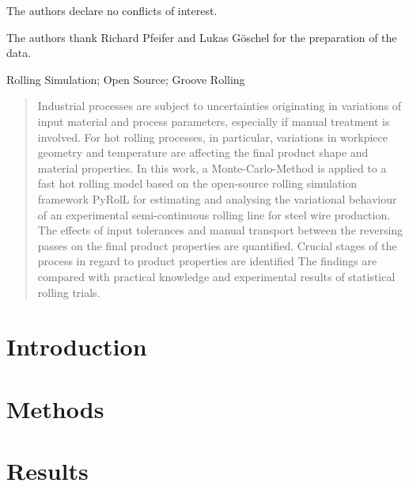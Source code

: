 \documentclass[DIV=13]{scrartcl}
\begin{document}
{        
        The authors declare no conflicts of interest.

        The authors thank Richard Pfeifer and Lukas Göschel for the preparation of the data.

        Rolling Simulation; Open Source; Groove Rolling
    }

    \maketitle

    \begin{abstract}
        Industrial processes are subject to uncertainties originating in variations of input material and process parameters,
        especially if manual treatment is involved.
        For hot rolling processes, in particular,
        variations in workpiece geometry and temperature are affecting the final product shape and material properties.
        In this work, a Monte-Carlo-Method is applied to a fast hot rolling model based on the open-source rolling simulation framework PyRolL for estimating and analysing the variational behaviour of an experimental semi-continuous rolling line for steel wire production.
        The effects of input tolerances and manual transport between the reversing passes on the final product properties are quantified.
        Crucial stages of the process in regard to product properties are identified
        The findings are compared with practical knowledge and experimental results of statistical rolling trials.
    \end{abstract}


    \section{Introduction}\label{sec:introduction}

    


    \section{Methods}\label{sec:methods}

    


    \section{Results}\label{sec:results}
\end{document}
